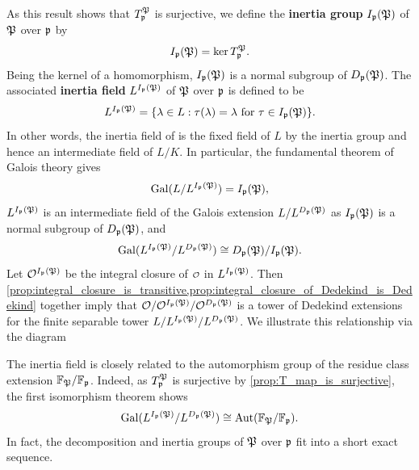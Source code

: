     As this result shows that \(T_{\mathfrak{p}}^{\mathfrak{P}}\) is surjective, we define the \textbf{inertia group} \(I_{\mathfrak{p}}(\mathfrak{P})\) of \(\mathfrak{P}\)  over \(\mathfrak{p}\) by
    \[
      I_{\mathfrak{p}}(\mathfrak{P}) = \ker{T_{\mathfrak{p}}^{\mathfrak{P}}}.
    \]
    Being the kernel of a homomorphism, \(I_{\mathfrak{p}}(\mathfrak{P})\) is a normal subgroup of \(D_{\mathfrak{p}}(\mathfrak{P})\). The associated \textbf{inertia field} \(L^{I_{\mathfrak{p}}(\mathfrak{P})}\) of \(\mathfrak{P}\) over \(\mathfrak{p}\) is defined to be
    \[
      L^{I_{\mathfrak{p}}(\mathfrak{P})} = \{\lambda \in L:\tau(\lambda) = \lambda \text{ for } \tau \in I_{\mathfrak{p}}(\mathfrak{P})\}.
    \]
    In other words, the inertia field of is the fixed field of \(L\) by the inertia group and hence an intermediate field of \(L/K\). In particular, the fundamental theorem of Galois theory gives
    \[
      \operatorname{\mathrm{Gal}}(L/L^{I_{\mathfrak{p}}(\mathfrak{P})}) = I_{\mathfrak{p}}(\mathfrak{P}),
    \]
    \(L^{I_{\mathfrak{p}}(\mathfrak{P})}\) is an intermediate field of the Galois extension \(L/L^{D_{\mathfrak{p}}(\mathfrak{P})}\) as \(I_{\mathfrak{p}}(\mathfrak{P})\) is a normal subgroup of \(D_{\mathfrak{p}}(\mathfrak{P})\), and
    \[
      \operatorname{\mathrm{Gal}}(L^{I_{\mathfrak{p}}(\mathfrak{P})}/L^{D_{\mathfrak{p}}(\mathfrak{P})}) \cong D_{\mathfrak{p}}(\mathfrak{P})/I_{\mathfrak{p}}(\mathfrak{P}).
    \]
    Let \(\mathcal{O}^{I_{\mathfrak{p}}(\mathfrak{P})}\) be the integral closure of \(\smc{O}\) in \(L^{I_{\mathfrak{p}}(\mathfrak{P})}\). Then \cref{prop:integral_closure_is_transitive,prop:integral_closure_of_Dedekind_is_Dedekind} together imply that \(\mathcal{O}/\mathcal{O}^{I_{\mathfrak{p}}(\mathfrak{P})}/\mathcal{O}^{D_{\mathfrak{p}}(\mathfrak{P})}\) is a tower of Dedekind extensions for the finite separable tower \(L/L^{I_{\mathfrak{p}}(\mathfrak{P})}/L^{D_{\mathfrak{p}}(\mathfrak{P})}\). We illustrate this relationship via the diagram
    \begin{center}
    \end{center}
    The inertia field is closely related to the automorphism group of the residue class extension \(\mathbb{F}_{\mathfrak{P}}/\mathbb{F}_{\mathfrak{p}}\). Indeed, as \(T_{\mathfrak{p}}^{\mathfrak{P}}\) is surjective by \cref{prop:T_map_is_surjective}, the first isomorphism theorem shows
    \[
      \operatorname{\mathrm{Gal}}(L^{I_{\mathfrak{p}}(\mathfrak{P})}/L^{D_{\mathfrak{p}}(\mathfrak{P})}) \cong \operatorname{\mathrm{Aut}}(\mathbb{F}_{\mathfrak{P}}/\mathbb{F}_{\mathfrak{p}}).
    \]
    In fact, the decomposition and inertia groups of \(\mathfrak{P}\) over \(\mathfrak{p}\) fit into a short exact sequence.

